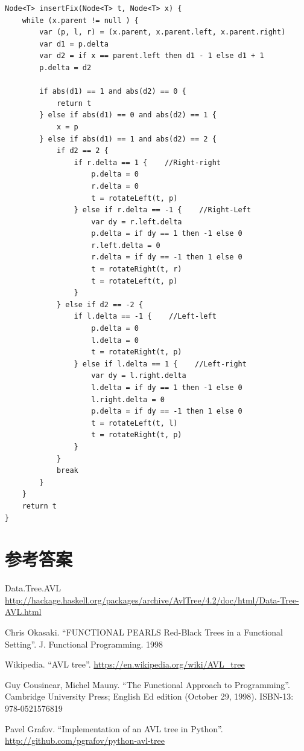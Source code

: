 \documentclass[b5paper]{ctexart}
\begin{document}
\begin{lstlisting}[language = Bourbaki]
Node<T> insertFix(Node<T> t, Node<T> x) {
    while (x.parent != null ) {
        var (p, l, r) = (x.parent, x.parent.left, x.parent.right)
        var d1 = p.delta
        var d2 = if x == parent.left then d1 - 1 else d1 + 1
        p.delta = d2

        if abs(d1) == 1 and abs(d2) == 0 {
            return t
        } else if abs(d1) == 0 and abs(d2) == 1 {
            x = p
        } else if abs(d1) == 1 and abs(d2) == 2 {
            if d2 == 2 {
                if r.delta == 1 {    //Right-right
                    p.delta = 0
                    r.delta = 0
                    t = rotateLeft(t, p)
                } else if r.delta == -1 {    //Right-Left
                    var dy = r.left.delta
                    p.delta = if dy == 1 then -1 else 0
                    r.left.delta = 0
                    r.delta = if dy == -1 then 1 else 0
                    t = rotateRight(t, r)
                    t = rotateLeft(t, p)
                }
            } else if d2 == -2 {
                if l.delta == -1 {    //Left-left
                    p.delta = 0
                    l.delta = 0
                    t = rotateRight(t, p)
                } else if l.delta == 1 {    //Left-right
                    var dy = l.right.delta
                    l.delta = if dy == 1 then -1 else 0
                    l.right.delta = 0
                    p.delta = if dy == -1 then 1 else 0
                    t = rotateLeft(t, l)
                    t = rotateRight(t, p)
                }
            }
            break
        }
    }
    return t
}
\end{lstlisting}

\section{参考答案}
\shipoutAnswer

\ifx\wholebook\relax \else
\begin{thebibliography}{99}

Data.Tree.AVL \url{http://hackage.haskell.org/packages/archive/AvlTree/4.2/doc/html/Data-Tree-AVL.html}

Chris Okasaki. ``FUNCTIONAL PEARLS Red-Black Trees in a Functional Setting''. J. Functional Programming. 1998

Wikipedia. ``AVL tree''. \url{https://en.wikipedia.org/wiki/AVL_tree}

Guy Cousinear, Michel Mauny. ``The Functional Approach to Programming''. Cambridge University Press; English Ed edition (October 29, 1998). ISBN-13: 978-0521576819

Pavel Grafov. ``Implementation of an AVL tree in Python''. \url{http://github.com/pgrafov/python-avl-tree}
\end{thebibliography}
\end{document}
